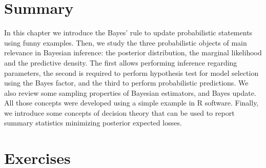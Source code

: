 \section{Summary}
In this chapter we introduce the Bayes' rule to update probabilistic statements using funny examples. Then, we study  the three probabilistic objects of main relevance in Bayesian inference: the posterior distribution, the marginal likelihood and the predictive density. The first allows performing inference regarding parameters, the second is required to perform hypothesis test for model selection using the Bayes factor, and the third to perform probabilistic predictions. We also review some sampling properties of Bayesian estimators, and Bayes update. All those concepts were developed using a simple example in R software. Finally, we introduce some concepts of decision theory that can be used to report summary statistics minimizing posterior expected losses.
 
\section{Exercises}

